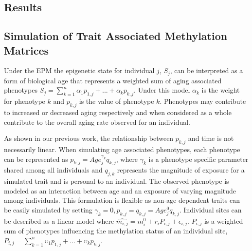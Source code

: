 \documentclass{article}
\begin{document}
{\begin{linenumbers}
\section{Results}

\subsection{Simulation of Trait Associated Methylation Matrices}

Under the EPM the epigenetic state for individual $j$, $S_j$, can be interpreted as a form of biological age that
represents a weighted sum of aging associated phenotypes 
$S_j = \sum^n_{k=1} \alpha_{1} p_{1,j} + ... + \alpha_{k} p_{k,j}$. Under this model $\alpha_{k}$ is the weight for 
phenotype $k$ and $p_{k,j}$ is the value of phenotype $k$.  Phenotypes may contribute to increased or decreased 
aging respectively and when considered as a whole contribute to the overall aging rate observed for an individual.

As shown in our previous work\cite{Snir2019-ii}, the relationship between $p_{k,j}$ and time is not necessarily 
linear. When simulating age associated phenotypes, each phenotype can be represented as 
$p_{k,j} = Age_j^{\gamma_{k}} q_{k,j}$, where $\gamma_{k}$ is a phenotype specific parameter shared among all 
individuals and $q_{j,k}$ represents the magnitude of exposure for a simulated trait and is personal to an 
individual. The observed phenotype is modeled as an interaction between age and an exposure of varying magnitude 
among individuals. This formulation is flexible as non-age dependent traits can be easily simulated by setting 
$\gamma_{k}=0, p_{k,j} = q_{k,j} = Age_j^{0}q_{k,j}$.  Individual sites can be described as a linear model where 
$\hat{m_{i,j}} = m^0_i + r_i P_{i,j} + \epsilon_{i,j}$. $P_{i,j}$ is a weighted sum of phenotypes influencing the 
methylation status of an individual site, $P_{i,j} = \sum^n_{k=1} \upsilon_{1} p_{1,j} + ... + \upsilon_{k} p_{k,j}$. 


\end{linenumbers}}
\end{document}

